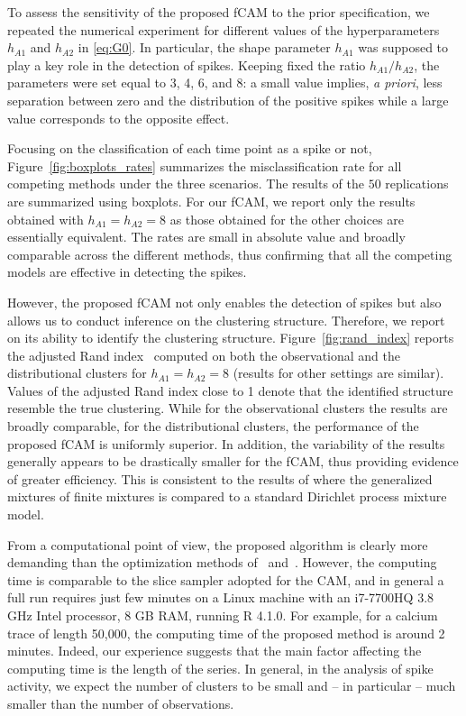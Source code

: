 To assess the sensitivity of the proposed fCAM to the prior specification, we repeated the numerical experiment for different values of the hyperparameters $h_{A1}$ and $h_{A2}$ in \eqref{eq:G0}. In particular, the shape parameter $h_{A1}$ was supposed to play a key role in the detection of spikes. Keeping fixed the ratio $h_{A1}/h_{A2}$, the parameters were set equal to 3, 4, 6, and 8: a small value implies, \textit{a priori}, less separation between zero and the distribution of the positive spikes while a large value corresponds to the opposite effect. 


Focusing on the classification of each time point as a spike or not, Figure~\ref{fig:boxplots_rates} summarizes the misclassification rate for all competing methods under the three scenarios. The results of the $50$ replications are summarized using boxplots. For our fCAM, we report only the results obtained with $h_{A1} = h_{A2} = 8$ as those obtained for the other choices are essentially equivalent.  The rates are small in absolute value and broadly comparable across the different methods, thus confirming that all the competing models are effective in detecting the spikes.  

However, the proposed fCAM not only enables the detection of spikes but also allows us to conduct inference on the clustering structure. Therefore, we report on its ability to identify the clustering structure. Figure~\ref{fig:rand_index} reports the adjusted Rand index~\parencite{rand1971,hubert1985} computed on both the observational and the distributional clusters for $h_{A1} = h_{A2} = 8$ (results for other settings are similar). Values of the adjusted Rand index close to 1 denote that the identified structure resemble the true clustering. While for the observational clusters the results are broadly comparable, for the distributional clusters, the performance of the proposed fCAM is uniformly superior. In addition, the variability of the results generally appears to be drastically smaller for the fCAM, thus providing evidence of greater efficiency. This is consistent to the results of \textcite{fruhwirthschnatter2020} where  the generalized mixtures of finite mixtures is compared to a standard Dirichlet process mixture model. 

From a computational point of view, the proposed algorithm is clearly more demanding than the optimization methods of~\textcite{jewell2019} and~\textcite{friedrich2017}.  However, the computing time is comparable to the slice sampler adopted for the CAM, and in general a full run requires just few minutes on a Linux machine with an i7-7700HQ 3.8 GHz Intel processor, 8 GB RAM, running R 4.1.0. For example, for a calcium trace of length 50,000, the computing time of the proposed method is around 2 minutes. Indeed, our experience suggests that the main factor affecting the computing time is the length of the series.  In general, in the analysis of spike activity, we expect the number of clusters  to be small and -- in particular -- much smaller than the number of observations.


